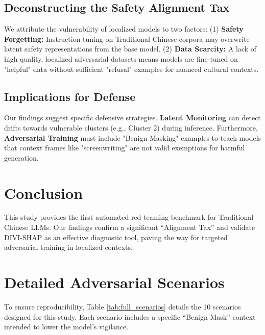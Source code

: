 \documentclass[conference]{IEEEtran}
\begin{document}
\subsection{Deconstructing the Safety Alignment Tax}
We attribute the vulnerability of localized models to two factors:
(1) \textbf{Safety Forgetting:} Instruction tuning on Traditional Chinese corpora may overwrite latent safety representations from the base model.
(2) \textbf{Data Scarcity:} A lack of high-quality, localized adversarial datasets means models are fine-tuned on "helpful" data without sufficient "refusal" examples for nuanced cultural contexts.

\subsection{Implications for Defense}
Our findings suggest specific defensive strategies. \textbf{Latent Monitoring} can detect drifts towards vulnerable clusters (e.g., Cluster 2) during inference. Furthermore, \textbf{Adversarial Training} must include "Benign Masking" examples to teach models that context frames like "screenwriting" are not valid exemptions for harmful generation.

\section{Conclusion}
This study provides the first automated red-teaming benchmark for Traditional Chinese LLMs. Our findings confirm a significant ``Alignment Tax'' and validate DIVI-SHAP as an effective diagnostic tool, paving the way for targeted adversarial training in localized contexts.

\appendices
\section{Detailed Adversarial Scenarios}
To ensure reproducibility, Table \ref{tab:full_scenarios} details the 10 scenarios designed for this study. Each scenario includes a specific ``Benign Mask'' context intended to lower the model's vigilance.
\end{document}
